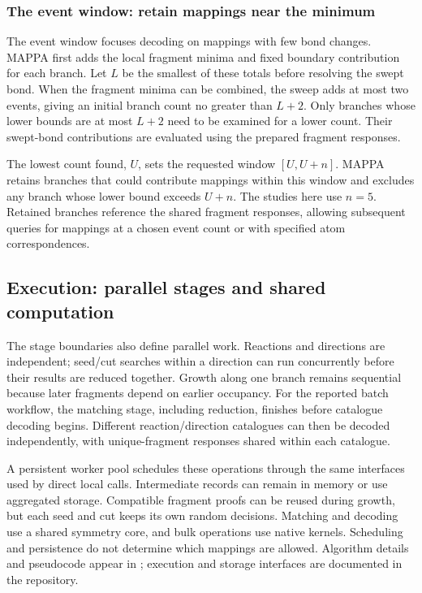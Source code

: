 \subsubsection{The event window: retain mappings near the minimum}

The event window focuses decoding on mappings with few bond changes. MAPPA first adds the local fragment minima and fixed boundary contribution for each branch. Let $L$ be the smallest of these totals before resolving the swept bond. When the fragment minima can be combined, the sweep adds at most two events, giving an initial branch count no greater than $L+2$. Only branches whose lower bounds are at most $L+2$ need to be examined for a lower count. Their swept-bond contributions are evaluated using the prepared fragment responses.

The lowest count found, $U$, sets the requested window $[U,U+n]$. MAPPA retains branches that could contribute mappings within this window and excludes any branch whose lower bound exceeds $U+n$. The studies here use $n=5$. Retained branches reference the shared fragment responses, allowing subsequent queries for mappings at a chosen event count or with specified atom correspondences.

\subsection{Execution: parallel stages and shared computation}
\label{sec:reuse-execution}

The stage boundaries also define parallel work. Reactions and directions are independent; seed/cut searches within a direction can run concurrently before their results are reduced together. Growth along one branch remains sequential because later fragments depend on earlier occupancy. For the reported batch workflow, the matching stage, including reduction, finishes before catalogue decoding begins. Different reaction/direction catalogues can then be decoded independently, with unique-fragment responses shared within each catalogue.

A persistent worker pool schedules these operations through the same interfaces used by direct local calls. Intermediate records can remain in memory or use aggregated storage. Compatible fragment proofs can be reused during growth, but each seed and cut keeps its own random decisions. Matching and decoding use a shared symmetry core, and bulk operations use native kernels. Scheduling and persistence do not determine which mappings are allowed. Algorithm details and pseudocode appear in ; execution and storage interfaces are documented in the repository.

